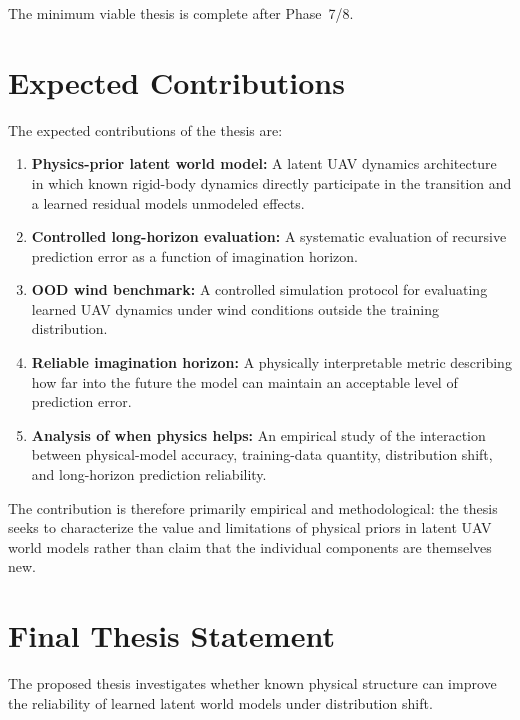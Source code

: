 \documentclass[conference]{IEEEtran}
\begin{document}
The minimum viable thesis is complete after Phase~7/8.


\section{Expected Contributions}


The expected contributions of the thesis are:

\begin{enumerate}

    \item \textbf{Physics-prior latent world model:}
    A latent UAV dynamics architecture in which known rigid-body
    dynamics directly participate in the transition and a learned
    residual models unmodeled effects.

    \item \textbf{Controlled long-horizon evaluation:}
    A systematic evaluation of recursive prediction error as a function
    of imagination horizon.

    \item \textbf{OOD wind benchmark:}
    A controlled simulation protocol for evaluating learned UAV
    dynamics under wind conditions outside the training distribution.

    \item \textbf{Reliable imagination horizon:}
    A physically interpretable metric describing how far into the future
    the model can maintain an acceptable level of prediction error.

    \item \textbf{Analysis of when physics helps:}
    An empirical study of the interaction between physical-model
    accuracy, training-data quantity, distribution shift, and
    long-horizon prediction reliability.

\end{enumerate}

The contribution is therefore primarily empirical and methodological:
the thesis seeks to characterize the value and limitations of physical
priors in latent UAV world models rather than claim that the individual
components are themselves new.


\section{Final Thesis Statement}


The proposed thesis investigates whether known physical structure can
improve the reliability of learned latent world models under
distribution shift.
\end{document}
